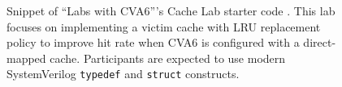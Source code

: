 
\begin{figure}[t]
    \centering
    \begin{minipage}{0.8\textwidth}
        \small
        \inputminted[frame=single,]{SystemVerilog}{media/code/cache_lab/cache.svh}
    \end{minipage}
    \caption[
        Caching Lab starter code snippet
    ]{
        Snippet of \enquote{Labs with CVA6}'s Cache Lab starter code \cite{labsWithCVA6}. This lab focuses on implementing a victim cache with LRU replacement policy to improve hit rate when CVA6 is configured with a direct-mapped cache. Participants are expected to use modern SystemVerilog \texttt{typedef} and \texttt{struct} constructs.
    }
    \label{fig:cache_lab}
\end{figure}

